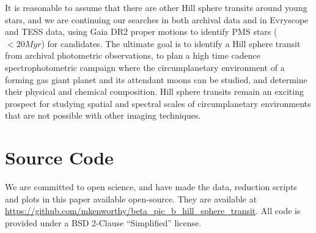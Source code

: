 \documentclass[longauth]{aa} %
\begin{document}
It is reasonable to assume that there are other Hill sphere transits around young stars, and we are continuing our searches in both archival data and in Evryscope and TESS data, using Gaia DR2 proper motions to identify PMS stars ($<20Myr$) for candidates.
%
The ultimate goal is to identify a Hill sphere transit from archival photometric observations, to plan a high time cadence spectrophotometric campaign where the circumplanetary environment of a forming gas giant planet and its attendant moons can be studied, and determine their physical and chemical composition.
%
Hill sphere transits remain an exciting prospect for studying spatial and spectral scales of circumplanetary environments that are not possible with other imaging techniques.

\section{Source Code}
We are committed to open science, and have made the data, reduction scripts and plots in this paper available open-source.
%
They are available at \url{https://github.com/mkenworthy/beta_pic_b_hill_sphere_transit}.
%
All code is provided under a BSD 2-Clause ``Simplified'' license.

\end{document}

